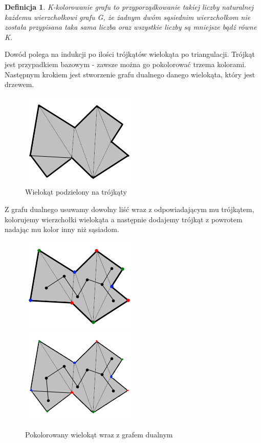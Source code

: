\documentclass[brudnopis]{xmgr}
\newtheorem{Definicja}{Definicja}
\begin{document}
\begin{Definicja}
   \textnormal{K-kolorowanie grafu} to przyporządkowanie takiej liczby naturalnej każdemu wierzchołkowi grafu G, że żadnym dwóm sąsiednim wierzchołkom nie została przypisana taka sama liczba oraz wszystkie liczby są mniejsze bądź równe K.
\end{Definicja}

Dowód polega na indukcji po ilości trójkątów wielokąta po triangulacji. Trójkąt jest przypadkiem bazowym - zawsze można go pokolorować trzema kolorami. Następnym krokiem jest stworzenie grafu dualnego danego wielokąta, który jest drzewem.

\begin{figure}[ht!]
  \centering
  \includegraphics{rysunki/dual.png}
    \caption{Wielokąt podzielony na trójkąty}
\end{figure} 
Z grafu dualnego usuwamy dowolny liść wraz z odpowiadającym mu trójkątem, kolorujemy wierzchołki wielokąta a następnie dodajemy trójkąt z powrotem nadając mu kolor inny niż sąsiadom.
\begin{figure}[ht!]
  \centering
    \includegraphics{rysunki/dual_kolor.png} 
    \includegraphics{rysunki/dual_caly_kolor.png}
    \caption{Pokolorowany wielokąt wraz z grafem dualnym}
\end{figure} 
\end{document}
